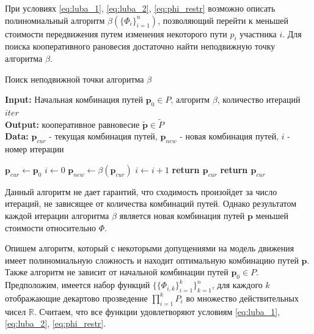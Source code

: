 \documentclass[12pt, a4paper]{article}
\begin{document}
При условиях \eqref{eq:luba_1}, \eqref{eq:luba_2}, \eqref{eq:phi_restr} возможно описать полиномиальный алгоритм $\beta(\{\Phi_i\}_{i = 1}^n)$, позволяющий перейти к меньшей стоимости передвижения путем изменения некоторого пути  $p_i$ участника $i$. Для поиска кооперативного рановесия достаточно найти неподвижную точку алгоритма $\beta$. 

\begin{algorithm}[H]
	\caption{Поиск неподвижной точки алгоритма $\beta$}
	\label{alg:coop_find1}
	{\bf {Input:}} Начальная комбинация путей $\textbf{p}_0 \in P$, алгоритм $\beta$, количество итераций $iter$\\
	{\bf {Output:}} кооперативное равновесие $\widetilde{\textbf{p}} \in \widetilde{P}$\\
	{\bf {Data:}} $\textbf{p}_{cur}$ - текущая комбинация путей, $\textbf{p}_{new}$ - новая комбинация путей, $i$ - номер итерации
	\begin{algorithmic}[1]
		\State $\textbf{p}_{cur} \gets \textbf{p}_0$
		\State $i \gets 0$
		\State $\textbf{p}_{new} \gets \beta (\textbf{p}_{cur}) $
		\State $i \gets i + 1$
			\State \textbf{return $\textbf{p}_{cur}$}
		\EndIf
		\EndWhile
	\State \textbf{return $\textbf{p}_{cur}$}
	\end{algorithmic}
\end{algorithm}

Данный алгоритм не дает гарантий, что сходимость произойдет за число итераций, не зависящее от количества комбинаций путей. Однако результатом каждой итерации алгоритма $\beta$ является новая комбинация путей $\textbf{p}$ меньшей стоимости относительно $\Phi$. 

Опишем алгоритм, который с некоторыми допущениями на модель движения имеет полиномиальную сложность и находит оптимальную комбинацию путей $\textbf{p}$.
Также алгоритм не зависит от начальной комбинации путей $\textbf{p}_0 \in P$. Предположим, имеется набор функций $\{\{\Phi_{i, k} \}_{i = 1}^k\}_{k = 1}^n$, для каждого $k$ отображающие декартово прозведение $\prod\limits_{i = 1}^kP_i$ во множество действительных чисел $\mathbb{R}$. Считаем, что все функции удовлетворяют условиям \eqref{eq:luba_1}, \eqref{eq:luba_2}, \eqref{eq:phi_restr}.
\end{document}
